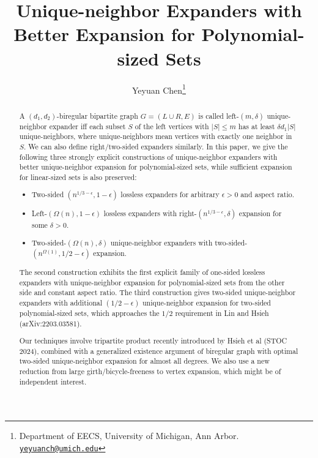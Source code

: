 \documentclass[11pt,letterpaper]{article}
\begin{document}
\title{Unique-neighbor Expanders with Better Expansion for Polynomial-sized Sets}
\author{
Yeyuan Chen\thanks{Department of EECS, University of Michigan, Ann Arbor. \href{mailto:yeyuanch@umich.edu}{\texttt{yeyuanch@umich.edu}}}} 
\date{}
\maketitle
\begin{abstract}
A $(d_1,d_2)$-biregular bipartite graph $G=(L\cup R,E)$ is called left-$(m,\delta)$ unique-neighbor expander iff each subset $S$ of the left vertices with $|S|\leq m$ has at least $\delta d_1|S|$ unique-neighbors, where unique-neighbors mean vertices with exactly one neighbor in $S$. We can also define right/two-sided expanders similarly. In this paper, we give the following three strongly explicit constructions of unique-neighbor expanders with better unique-neighbor expansion for polynomial-sized sets, while sufficient expansion for linear-sized sets is also preserved:
\begin{itemize}
\item Two-sided $(n^{1/3-\epsilon},1-\epsilon)$ lossless expanders for arbitrary $\epsilon>0$ and aspect ratio.
\item Left-$(\Omega(n),1-\epsilon)$ lossless expanders with right-$(n^{1/3-\epsilon},\delta)$ expansion for some $\delta>0$.
\item Two-sided-$(\Omega(n),\delta)$ unique-neighbor expanders with two-sided-$(n^{\Omega(1)},1/2-\epsilon)$ expansion.
\end{itemize}
The second construction exhibits the first explicit family of one-sided lossless expanders with unique-neighbor expansion for polynomial-sized sets from the other side and constant aspect ratio. The third construction gives two-sided unique-neighbor expanders with additional $(1/2-\epsilon)$ unique-neighbor expansion for two-sided polynomial-sized sets, which approaches the 
$1/2$ requirement in Lin and Hsieh (arXiv:2203.03581).

Our techniques involve tripartite product recently introduced by Hsieh et al (STOC 2024), combined with a generalized existence argument of biregular graph with optimal two-sided unique-neighbor expansion for almost all degrees. We also use a new reduction from large girth/bicycle-freeness to vertex expansion, which might be of independent interest.
\end{abstract}
\setcounter{tocdepth}{2}
\end{document}
